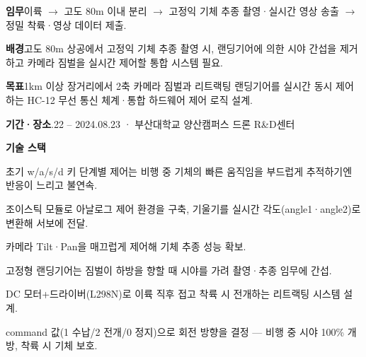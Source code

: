 

\begin{cvitems}
  \item {\textbf{임무}\enskip 이륙 $\to$ 고도 80m 이내 분리 $\to$ 고정익 기체 추종 촬영·실시간 영상 송출 $\to$ 정밀 착륙·영상 데이터 제출.}
  \item {\textbf{배경}\enskip 고도 80m 상공에서 고정익 기체 추종 촬영 시, 랜딩기어에 의한 시야 간섭을 제거하고 카메라 짐벌을 실시간 제어할 통합 시스템 필요.}
  \item {\textbf{목표}\enskip 1km 이상 장거리에서 2축 카메라 짐벌과 리트랙팅 랜딩기어를 실시간 동시 제어하는 HC-12 무선 통신 체계·통합 하드웨어 제어 로직 설계.}
  \item {\textbf{기간·장소}.22 -- 2024.08.23 · 부산대학교 양산캠퍼스 드론 R\&D센터}
  \item {\textbf{기술 스택}\enskip {}     }
\end{cvitems}



\begin{substeps}
  \item 초기 w/a/s/d 키 단계별 제어는 비행 중 기체의 빠른 움직임을 부드럽게 추적하기엔 반응이 느리고 불연속.
  \item 조이스틱 모듈로 아날로그 제어 환경을 구축, 기울기를 실시간 각도(angle1·angle2)로 변환해 서보에 전달.
  \item 카메라 Tilt·Pan을 매끄럽게 제어해 기체 추종 성능 확보.
\end{substeps}

\begin{substeps}
  \item 고정형 랜딩기어는 짐벌이 하방을 향할 때 시야를 가려 촬영·추종 임무에 간섭.
  \item DC 모터+드라이버(L298N)로 이륙 직후 접고 착륙 시 전개하는 리트랙팅 시스템 설계.
  \item command 값(1 수납/2 전개/0 정지)으로 회전 방향을 결정 --- 비행 중 시야 100\% 개방, 착륙 시 기체 보호.
\end{substeps}

